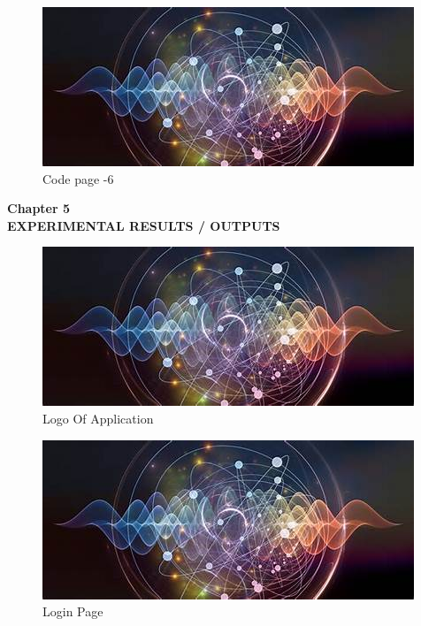 \documentclass[12pt]{article}
\begin{document}
 \begin{figure}[h]
 \centering
 \includegraphics[scale=1]{Quantum}
  \caption{Code page -6}
 \end{figure}

\clearpage



\begin{center}
 \LARGE \textbf {Chapter 5 }\\[10mm]
 \Large \textbf{EXPERIMENTAL RESULTS / OUTPUTS }\\[10mm]
 \end{center}
 
 \begin{figure}[h]
 \centering
 \includegraphics[scale=1]{Quantum}
 \caption{Logo Of Application}
 \end{figure}

 
 \begin{figure}[h]
 \centering
 \includegraphics[scale=1]{Quantum}
 \caption{Login Page}
 \end{figure}
 
\end{document}
